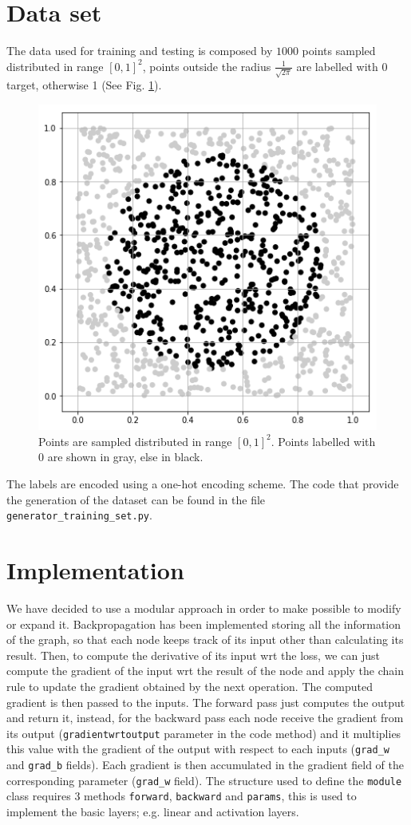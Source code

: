 \documentclass[journal, a4paper]{IEEEtran}
\begin{document}
\section{Data set}
\label{sec:dataset}
The data used for training and testing is composed by $1000$ points sampled distributed in range $[0, 1]^2$, points outside the radius $\frac{1}{\sqrt{2\pi}}$ are labelled with 0 target, otherwise 1 (See Fig. \ref{fig:generated-dataset}).
\begin{figure}[!h]
    \centering
    \includegraphics[width=0.8\linewidth]{gen.png}
    \caption{Points are sampled distributed in range $[0, 1]^2$. Points labelled with 0 are shown in gray, else in black.}
    \label{fig:generated-dataset}
\end{figure}
The labels are encoded using a one-hot encoding scheme.
The code that provide the generation of the dataset can be found in the file \texttt{generator\_training\_set.py}.

\section{Implementation}
We have decided to use a modular approach in order to make possible to modify or expand it. Backpropagation has been implemented storing all the information of the graph, so that each node keeps track of its input other than calculating its result. Then, to compute the derivative of its input wrt the loss, we can just compute the gradient of the input wrt the result of the node and apply the chain rule to update the gradient obtained by the next operation. The computed gradient is then passed to the inputs. The forward pass just computes the output and return it, instead, for the backward pass each node receive the gradient from its output (\texttt{gradientwrtoutput} parameter in the code method) and it multiplies this value with the gradient of the output with respect to each inputs (\texttt{grad\_w} and \texttt{grad\_b} fields). Each gradient is then accumulated in the gradient field of the corresponding parameter (\texttt{grad\_w} field). The structure used to define the \texttt{module} class requires 3 methods \texttt{forward}, \texttt{backward} and \texttt{params}, this is used to implement the basic layers; e.g. linear and activation layers.
\end{document}
